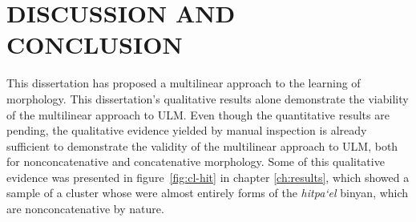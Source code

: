 \chapter{DISCUSSION AND CONCLUSION}
\label{ch:conclusion}

This dissertation has proposed a multilinear approach to the learning of morphology.
This dissertation’s qualitative results alone demonstrate the 
viability of the multilinear approach to ULM. 
Even though the quantitative results
are pending, the qualitative evidence yielded by manual 
inspection is already sufficient to demonstrate the validity of the 
multilinear approach to ULM, both for nonconcatenative 
and concatenative morphology. 
Some of this qualitative evidence was 
presented in figure~\ref{fig:cl-hit} in chapter \ref{ch:results}, which 
showed a sample of a cluster whose were almost entirely forms
of the \emph{hitpa`el} binyan, which are nonconcatenative by nature. 


